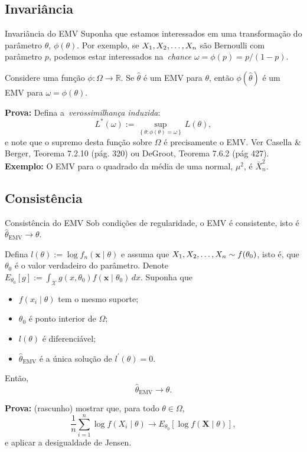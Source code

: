 \subsection*{Invariância} 
\begin{frame}{Invariância do EMV}
Suponha que estamos interessados em uma transformação do parâmetro $\theta$, $\phi(\theta)$.
Por exemplo, se $X_1, X_2, \ldots, X_n$ são Bernoulli com parâmetro $p$,  podemos estar interessados na~\textit{chance} $\omega = \phi(p) = p/(1-p)$.
\begin{theo}
\label{thm:invariance_MLE}
 Considere uma função $\phi : \Omega \to \mathbb{R}$.
 Se $\hat{\theta}$ é um EMV para $\theta$, então $\phi(\hat{\theta})$ é um EMV para $\omega = \phi(\theta)$.
\end{theo}
\textbf{Prova:} Defina a~\textit{verossimilhança induzida}:
\[ L^\ast(\omega) := \sup_{\left\{ \theta: \phi(\theta) = \omega \right\}} L(\theta), \]
e note que o supremo desta função sobre $\Omega$ é precisamente o EMV.
Ver Casella \& Berger, Teorema 7.2.10 (pág. 320) ou DeGroot, Teorema 7.6.2 (pág 427).
\textbf{Exemplo:} O EMV para o quadrado da média de uma normal, $\mu^2$, é $\bar{X}_n^2$.
\end{frame}

\subsection*{Consistência} 

\begin{frame}{Consistência do EMV}
Sob condições de regularidade, o EMV é consistente, isto é $\hat{\theta}_{\text{EMV}} \xrightarrow{} \theta$.
\begin{theo}
\label{thm:consistency_MLE}
Defina $l(\theta) := \log f_n(\boldsymbol{x} \mid \theta)$ e assuma que $X_1, X_2, \ldots, X_n \sim f(\theta_0)$, isto é, que $\theta_0$ é o valor verdadeiro do parâmetro.
Denote $E_{\theta_0}[g] := \int_{\mathcal{X}} g(x, \theta_0) f(\boldsymbol{x} \mid \theta_0)\, dx$.
 Suponha que 
 \begin{itemize}
  \item $f(x_i \mid \theta)$ tem o mesmo suporte;
  \item $\theta_0$ é ponto interior de $\Omega$;
  \item $l(\theta)$ é diferenciável;
  \item $\hat{\theta}_{\text{EMV}}$ é a única solução de $l^\prime(\theta) = 0$.
 \end{itemize}
   Então,
  $$\hat{\theta}_{\text{EMV}} \xrightarrow{} \theta.$$
\end{theo}
\textbf{Prova:} (rascunho) mostrar que, para todo $\theta \in \Omega$,
\[ \frac{1}{n} \sum_{i=1}^n \log f(X_i \mid \theta) \xrightarrow{} E_{\theta_0}\left[ \log f(\boldsymbol{X} \mid \theta) \right], \]
e aplicar a desigualdade de Jensen.
\end{frame}

